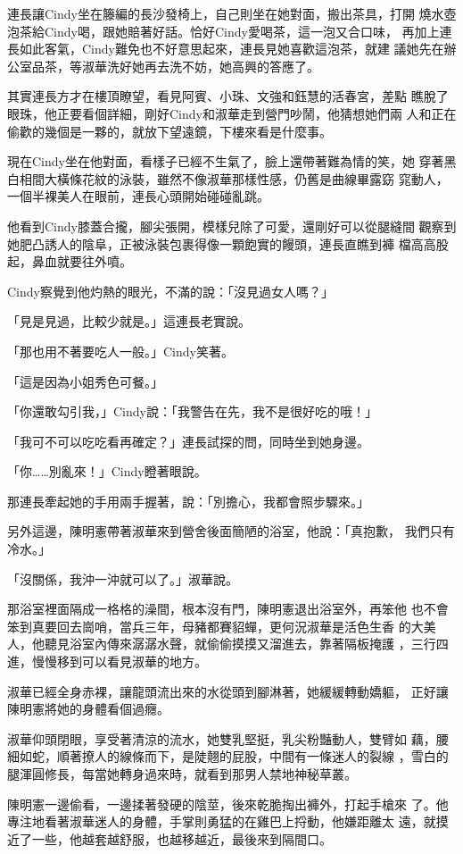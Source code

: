 連長讓Cindy坐在籐編的長沙發椅上，自己則坐在她對面，搬出茶具，打開
燒水壺泡茶給Cindy喝，跟她賠著好話。恰好Cindy愛喝茶，這一泡又合口味，
再加上連長如此客氣，Cindy難免也不好意思起來，連長見她喜歡這泡茶，就建
議她先在辦公室品茶，等淑華洗好她再去洗不妨，她高興的答應了。

其實連長方才在樓頂瞭望，看見阿賓、小珠、文強和鈺慧的活春宮，差點
瞧脫了眼珠，他正要看個詳細，剛好Cindy和淑華走到營門吵鬧，他猜想她們兩
人和正在偷歡的幾個是一夥的，就放下望遠鏡，下樓來看是什麼事。

現在Cindy坐在他對面，看樣子已經不生氣了，臉上還帶著難為情的笑，她
穿著黑白相間大橫條花紋的泳裝，雖然不像淑華那樣性感，仍舊是曲線畢露窈
窕動人，一個半裸美人在眼前，連長心頭開始碰碰亂跳。

他看到Cindy膝蓋合攏，腳尖張開，模樣兒除了可愛，還剛好可以從腿縫間
觀察到她肥凸誘人的陰阜，正被泳裝包裹得像一顆飽實的饅頭，連長直瞧到褲
檔高高股起，鼻血就要往外噴。

Cindy察覺到他灼熱的眼光，不滿的說：「沒見過女人嗎？」

「見是見過，比較少就是。」這連長老實說。

「那也用不著要吃人一般。」Cindy笑著。

「這是因為小姐秀色可餐。」

「你還敢勾引我，」Cindy說：「我警告在先，我不是很好吃的哦！」

「我可不可以吃吃看再確定？」連長試探的問，同時坐到她身邊。

「你……別亂來！」Cindy瞪著眼說。

那連長牽起她的手用兩手握著，說：「別擔心，我都會照步驟來。」

另外這邊，陳明憲帶著淑華來到營舍後面簡陋的浴室，他說：「真抱歉，
我們只有冷水。」

「沒關係，我沖一沖就可以了。」淑華說。

那浴室裡面隔成一格格的澡間，根本沒有門，陳明憲退出浴室外，再笨他
也不會笨到真要回去崗哨，當兵三年，母豬都賽貂蟬，更何況淑華是活色生香
的大美人，他聽見浴室內傳來潺潺水聲，就偷偷摸摸又溜進去，靠著隔板掩護
，三行四進，慢慢移到可以看見淑華的地方。

淑華已經全身赤裸，讓龍頭流出來的水從頭到腳淋著，她緩緩轉動嬌軀，
正好讓陳明憲將她的身體看個過癮。

淑華仰頭閉眼，享受著清涼的流水，她雙乳堅挺，乳尖粉豔動人，雙臂如
藕，腰細如蛇，順著撩人的線條而下，是陡翹的屁股，中間有一條迷人的裂線
，雪白的腿渾圓修長，每當她轉身過來時，就看到那男人禁地神秘草叢。

陳明憲一邊偷看，一邊揉著發硬的陰莖，後來乾脆掏出褲外，打起手槍來
了。他專注地看著淑華迷人的身體，手掌則勇猛的在雞巴上捋動，他嫌距離太
遠，就摸近了一些，他越套越舒服，也越移越近，最後來到隔間口。

